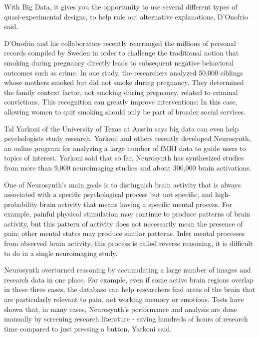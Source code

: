 With Big Data, it gives you the opportunity to use several different 
types of quasi-experimental designs, to help rule out alternative 
explanations, D’Onofrio said\cite{editor00}.

D'Onofrio and his collaborators recently rearranged the millions of 
personal records compiled by Sweden in order to challenge the traditional 
notion that smoking during pregnancy directly leads to subsequent negative 
behavioral outcomes such as crime. In one study, the researchers analyzed 
50,000 siblings whose mothers smoked but did not smoke during pregnancy. 
They determined the family context factor, not smoking during pregnancy, 
related to criminal convictions. This recognition can greatly improve 
interventions: 
In this case, allowing women to quit smoking should only be part of 
broader social services\cite{editor00}.

Tal Yarkoni of the University of Texas at Austin says big data can 
even help psychologists study research. Yarkoni and others recently 
developed Neurosynth, an online program for analyzing a large number 
of fMRI data to guide users to topics of interest. Yarkoni said that 
so far, Neurosynth has synthesized studies from more than 9,000 
neuroimaging studies and about 300,000 brain activations\cite{editor00}.

One of Neurosynth's main goals is to distinguish brain activity that 
is always associated with a specific psychological process but not 
specific, and high-probability brain activity that means having a 
specific mental process. For example, painful physical stimulation 
may continue to produce patterns of brain activity, but this pattern 
of activity does not necessarily mean the presence of pain; other 
mental states may produce similar patterns. Infer mental processes 
from observed brain activity, this process is called reverse 
reasoning, it is difficult to do in a single neuroimaging study\cite{editor00}.

Neurosynth overturned reasoning by accumulating a large number of 
images and research data in one place. For example, even if some 
active brain regions overlap in these three cases, the database can 
help researchers find areas of the brain that are particularly relevant 
to pain, not working memory or emotions. Tests have shown that, in many 
cases, Neurosynth's performance and analysis are done manually by 
screening research literature - saving hundreds of hours of research 
time compared to just pressing a button, Yarkoni said\cite{editor00}.

